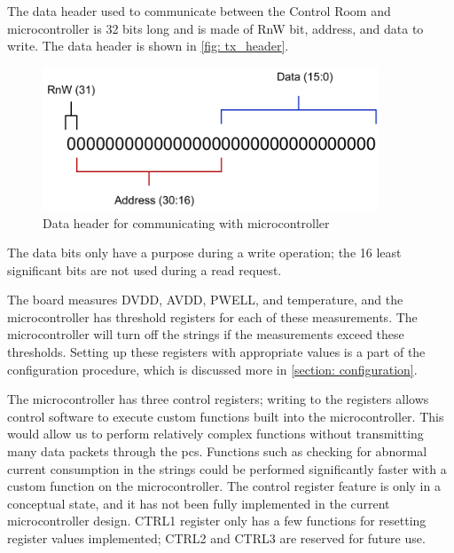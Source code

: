 \documentclass[main.tex]{subfiles}
\begin{document}
The data header used to communicate between the Control Room and microcontroller is 32 bits long and is made of RnW bit, address, and data to write. The data header is shown in \autoref{fig: tx_header}.

\begin{figure}[!htpb]
    \centering
    \includegraphics[width=10cm, scale=1]{images/TX packet header.pdf}
    \caption{Data header for communicating with microcontroller}
    \label{fig: tx_header}
\end{figure}
\FloatBarrier

The data bits only have a purpose during a write operation; the 16 least significant bits are not used during a read request.

The board measures DVDD, AVDD, PWELL, and temperature, and the microcontroller has threshold registers for each of these measurements. The microcontroller will turn off the strings if the measurements exceed these thresholds. Setting up these registers with appropriate values is a part of the configuration procedure, which is discussed more in \autoref{section: configuration}.

The microcontroller has three control registers; writing to the registers allows control software to execute custom functions built into the microcontroller. This would allow us to perform relatively complex functions without transmitting many data packets through the \gls{pcs}. Functions such as checking for abnormal current consumption in the strings could be performed significantly faster with a custom function on the microcontroller. The control register feature is only in a conceptual state, and it has not been fully implemented in the current microcontroller design. CTRL1 register only has a few functions for resetting register values implemented; CTRL2 and CTRL3 are reserved for future use.
\end{document}
